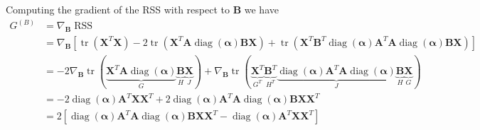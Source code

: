 \documentclass[oneside]{article}
\begin{document}
Computing the gradient of the RSS with respect to $\mathbf{B}$ we have
\begin{equation}
    \label{eq:relaxed_objective_grad_B}
    \begin{aligned}
        G^{(B)} &= \nabla_{\mathbf{B}} \operatorname{RSS} \\
        &= \nabla_{\mathbf{B}}
        \left[
            \operatorname{tr}\left( \mathbf{X}^T \mathbf{X} \right)
            - 2 \operatorname{tr} \left( \mathbf{{X}}^T \mathbf{{A}} \operatorname{diag}(\boldsymbol{\alpha}) \mathbf{B} \mathbf{X} \right)
            + \operatorname{tr} \left( \mathbf{X}^T \mathbf{B}^T \operatorname{diag}(\boldsymbol{\alpha}) \mathbf{{A}}^T \mathbf{{A}} \operatorname{diag}(\boldsymbol{\alpha}) \mathbf{B} \mathbf{X} \right)
        \right] \\
        &=
            - 2 \nabla_{\mathbf{B}} \operatorname{tr}(\underbrace{\mathbf{{X}}^T \mathbf{{A}} \operatorname{diag}(\boldsymbol{\alpha})}_{G} \underbrace{\mathbf{B}}_{H} \underbrace{\mathbf{X}}_{J})
            + \nabla_{\mathbf{B}} \operatorname{tr}(\underbrace{\mathbf{X}^T}_{G^T} \underbrace{\mathbf{B}^T}_{H^T} \underbrace{\operatorname{diag}(\boldsymbol{\alpha}) \mathbf{{A}}^T \mathbf{{A}} \operatorname{diag}(\boldsymbol{\alpha})}_{J} \underbrace{\mathbf{B}}_{H} \underbrace{\mathbf{X}}_{G}) \\
        & =
            -2 \operatorname{diag}(\boldsymbol{\alpha}) \mathbf{{A}}^T \mathbf{{X}} \mathbf{X}^T
            +2 \operatorname{diag}(\boldsymbol{\alpha}) \mathbf{{A}}^T \mathbf{{A}} \operatorname{diag}(\boldsymbol{\alpha}) \mathbf{B} \mathbf{X} \mathbf{X}^T \\
        & = 2
        \left[
            \operatorname{diag}(\boldsymbol{\alpha}) \mathbf{{A}}^T \mathbf{{A}} \operatorname{diag}(\boldsymbol{\alpha}) \mathbf{B} \mathbf{X} \mathbf{X}^T
            - \operatorname{diag}(\boldsymbol{\alpha}) \mathbf{{A}}^T \mathbf{{X}} \mathbf{X}^T
        \right]
    \end{aligned}
\end{equation}
\end{document}
